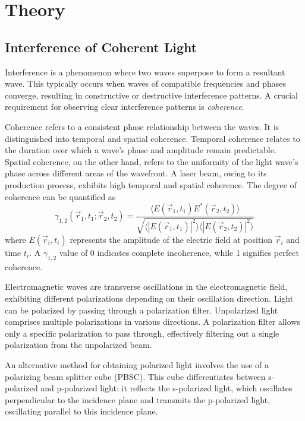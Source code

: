 \section{Theory}
\label{sec:theory}

\subsection{Interference of Coherent Light}
\label{sec:interference}
Interference is a phenomenon where two waves superpose to form a resultant wave. 
This typically occurs when waves of compatible frequencies and phases converge, 
resulting in constructive or destructive interference patterns. 
A crucial requirement for observing clear interference patterns is \textit{coherence}.

Coherence refers to a consistent phase relationship between the waves. 
It is distinguished into temporal and spatial coherence. Temporal coherence 
relates to the duration over which a wave's phase and amplitude remain predictable. 
Spatial coherence, on the other hand, refers to the uniformity of the light wave's 
phase across different areas of the wavefront. 
A laser beam, owing to its production process, exhibits high temporal and spatial 
coherence. The degree of coherence can be quantified as
\begin{equation}
    \gamma_{1,2}(\vec{r}_1,t_1;\vec{r}_2,t_2)=
    \frac{\langle E(\vec{r}_1,t_1)E^*(\vec{r}_2,t_2) \rangle}{\sqrt{\langle |E(\vec{r}_1,t_1)|^2 \rangle\langle |E(\vec{r}_2,t_2)|^2 \rangle}}
    \label{eqn:degree}
\end{equation}
where $E(\vec{r}_i,t_i)$ represents the amplitude of the electric field at position $\vec{r}_i$ 
and time $t_i$. A $\gamma_{1,2}$ value of \num{0} indicates complete incoherence, while 
\num{1} signifies perfect coherence.

Electromagnetic waves are transverse oscillations in the electromagnetic field, 
exhibiting different polarizations depending on their oscillation direction. 
Light can be polarized by passing through a polarization filter. Unpolarized light 
comprises multiple polarizations in various directions. A polarization filter 
allows only a specific polarization to pass through, effectively filtering out a 
single polarization from the unpolarized beam.

An alternative method for obtaining polarized light involves the use of a polarizing 
beam splitter cube (PBSC). This cube differentiates between s-polarized and 
p-polarized light: it reflects the s-polarized light, which oscillates perpendicular 
to the incidence plane and transmits the p-polarized light, oscillating parallel to 
this incidence plane.


